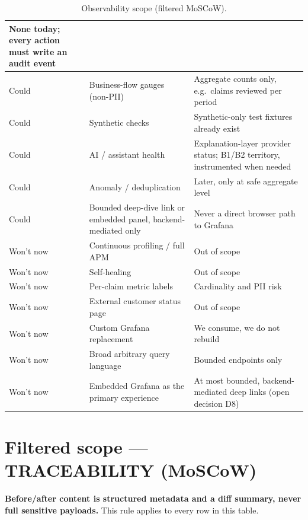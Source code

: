 \documentclass[11pt]{article}
\begin{document}
\begin{table}[h]
\begin{tabularx}{\textwidth}{@{} l L L @{}}
None today; every action must write an audit event \\
\midrule
Could & Business-flow gauges (non-PII) &
Aggregate counts only, e.g.\ claims reviewed per period \\
Could & Synthetic checks &
Synthetic-only test fixtures already exist \\
Could & AI / assistant health &
Explanation-layer provider status; B1/B2 territory, instrumented when needed \\
Could & Anomaly / deduplication &
Later, only at safe aggregate level \\
Could & Bounded deep-dive link or embedded panel, backend-mediated only &
Never a direct browser path to Grafana \\
\midrule
Won't now & Continuous profiling / full APM &
Out of scope \\
Won't now & Self-healing &
Out of scope \\
Won't now & Per-claim metric labels &
Cardinality and PII risk \\
Won't now & External customer status page &
Out of scope \\
Won't now & Custom Grafana replacement &
We consume, we do not rebuild \\
Won't now & Broad arbitrary query language &
Bounded endpoints only \\
Won't now & Embedded Grafana as the primary experience &
At most bounded, backend-mediated deep links (open decision D8) \\
\bottomrule
\end{tabularx}
\caption{Observability scope (filtered MoSCoW).}
\label{tab:obs-must}
\end{table}

\section{Filtered scope --- TRACEABILITY (MoSCoW)}

\textbf{Before/after content is structured metadata and a diff summary, never
full sensitive payloads.} This rule applies to every row in this table.
\end{document}
